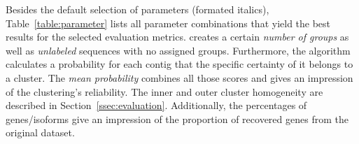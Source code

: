 \documentclass[12pt,a4paper,english]{article}
\begin{document}
	Besides the default selection of parameters (formated italics), Table~\ref{table:parameter} lists all parameter combinations that yield the best results for the selected evaluation metrics.
	\hdbscan creates a certain \textit{number of groups} as well as \textit{unlabeled} sequences with no assigned groups. Furthermore, the algorithm calculates a probability for each contig that the specific certainty of it belongs to a cluster. The \textit{mean probability} combines all those scores and gives an impression of the clustering's reliability. The inner and outer cluster homogeneity are described in Section~\ref{ssec:evaluation}. Additionally, the percentages of genes/isoforms give an impression of the proportion of recovered genes from the original dataset.
	
		\begin{table}[H]


\end{table}
\end{document}
